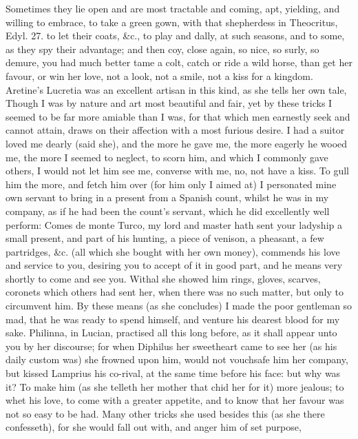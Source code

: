 {Sometimes they lie open and are most tractable and coming, apt,
yielding, and willing to embrace, to take a green gown, with that
shepherdess in Theocritus, Edyl. 27. to let their coats, \&c., to play
and dally, at such seasons, and to some, as they spy their advantage;
and then coy, close again, so nice, so surly, so demure, you had much
better tame a colt, catch or ride a wild horse, than get her favour, or
win her love, not a look, not a smile, not a kiss for a kingdom.
Aretine's Lucretia was an excellent artisan in this kind, as she
tells her own tale, Though I was by nature and art most beautiful and
fair, yet by these tricks I seemed to be far more amiable than I was,
for that which men earnestly seek and cannot attain, draws on their
affection with a most furious desire. I had a suitor loved me dearly
(said she), and the more he gave me, the more eagerly he wooed
me, the more I seemed to neglect, to scorn him, and which I commonly
gave others, I would not let him see me, converse with me, no, not have
a kiss. To gull him the more, and fetch him over (for him only I aimed
at) I personated mine own servant to bring in a present from a Spanish
count, whilst he was in my company, as if he had been the count's
servant, which he did excellently well perform: Comes de monte
Turco, my lord and master hath sent your ladyship a small present, and
part of his hunting, a piece of venison, a pheasant, a few partridges,
\&c. (all which she bought with her own money), commends his love and
service to you, desiring you to accept of it in good part, and he means
very shortly to come and see you. Withal she showed him rings, gloves,
scarves, coronets which others had sent her, when there was no such
matter, but only to circumvent him. By these means (as she
concludes) I made the poor gentleman so mad, that he was ready to spend
himself, and venture his dearest blood for my sake. Philinna, in
Lucian, practised all this long before, as it shall appear unto
you by her discourse; for when Diphilus her sweetheart came to see her
(as his daily custom was) she frowned upon him, would not vouchsafe him
her company, but kissed Lamprius his co-rival, at the same time
before his face: but why was it? To make him (as she telleth her
mother that chid her for it) more jealous; to whet his love, to come
with a greater appetite, and to know that her favour was not so easy to
be had. Many other tricks she used besides this (as she there
confesseth), for she would fall out with, and anger him of set purpose,
}
